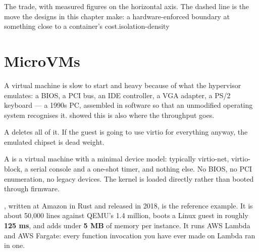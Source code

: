 {}%
{The trade, with measured figures on the horizontal axis. The dashed line is
the move the designs in this chapter make: a hardware-enforced boundary at
something close to a container's cost.}{isolation-density}

\section{MicroVMs}

A virtual machine is slow to start and heavy because of what the hypervisor
emulates: a BIOS, a PCI bus, an IDE controller, a VGA adapter, a PS/2 keyboard
--- a 1990s PC, assembled in software so that an unmodified operating system
recognises it.  showed this is also where the throughput goes.

A  deletes all of it. If the guest is going to use virtio for
everything anyway, the emulated chipset is dead weight.

\begin{definitionbox}[MicroVM]
A  is a virtual machine with a minimal device model: typically
virtio-net, virtio-block, a serial console and a one-shot timer, and nothing
else. No BIOS, no PCI enumeration, no legacy devices. The kernel is loaded
directly rather than booted through firmware.

\smallskip
{}, written at Amazon in Rust and released in 2018, is the
reference example. It is about 50{,}000 lines against QEMU's 1.4 million, boots
a Linux guest in roughly \textbf{125 ms}, and adds under \textbf{5 MB} of
memory per instance. It runs AWS Lambda and AWS Fargate: every function
invocation you have ever made on Lambda ran in one.
\end{definitionbox}

